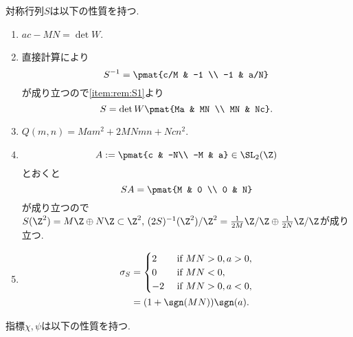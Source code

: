 \documentclass[11pt,b5paper,oneside,lualatex]{ltjsarticle} %
\numberwithin{equation}{section} %
\begin{document}
対称行列$ S $は以下の性質を持つ. 

\begin{rem} \label{rem:S}
	\begin{enumerate}
		\item \label{item:rem:S1} $ ac - MN = \det W $.
		\item \label{item:rem:S2}
		直接計算により
		\[
		S^{-1} = \pmat{c/M & -1 \\ -1 & a/N}
		\]
		が成り立つので\cref{item:rem:S1}より
		\[
		S = \det W \pmat{Ma & MN \\ MN & Nc}.
		\]
		\item \label{item:rem:S3} $ Q(m, n) = Mam^2 + 2MNmn + Ncn^2 $.
		\item \label{item:rem:S4}
		\[
		A := \pmat{c & -N\\ -M & a} \in \SL_2(\Z)
		\]
		とおくと
		\[
		SA = \pmat{M & 0 \\ 0 & N}
		\]
		が成り立つので$ S(\Z^2)= M\Z \oplus N\Z \subset \Z^2, \, (2S)^{-1}(\Z^2)/\Z^2 = \frac{1}{2M}\Z/\Z \oplus \frac{1}{2N}\Z/\Z $が成り立つ.
		\item \label{item:rem:S5}
		\begin{align}
			\sigma_S 
			&=
			\begin{cases}
				2 & \text{ if } MN>0, a > 0, \\
				0 & \text{ if } MN<0, \\
				-2 & \text{ if } MN>0, a < 0, \\
			\end{cases}
			\\
			&=
			(1 + \sgn(MN)) \sgn(a).
		\end{align}
	\end{enumerate}
\end{rem}

指標$ \chi, \psi $は以下の性質を持つ. 
\end{document}
